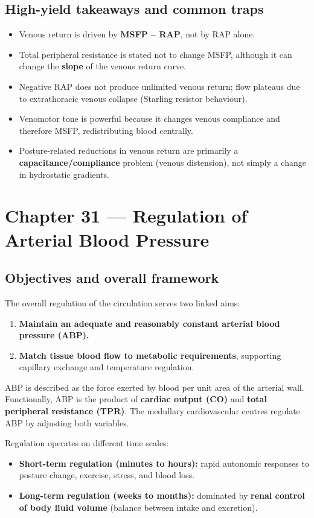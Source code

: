 \documentclass[11pt,a4paper]{article}
\begin{document}
\subsection{High-yield takeaways and common traps}
\begin{itemize}
\item Venous return is driven by \textbf{MSFP -- RAP}, not by RAP alone.
\item Total peripheral resistance is stated not to change MSFP, although it can change the \textbf{slope} of the venous return curve.
\item Negative RAP does not produce unlimited venous return; flow plateaus due to extrathoracic venous collapse (Starling resistor behaviour).
\item Venomotor tone is powerful because it changes venous compliance and therefore MSFP, redistributing blood centrally.
\item Posture-related reductions in venous return are primarily a \textbf{capacitance/compliance} problem (venous distension), not simply a change in hydrostatic gradients.
\end{itemize}


\section{Chapter 31 --- Regulation of Arterial Blood Pressure}

\subsection{Objectives and overall framework}
The overall regulation of the circulation serves two linked aims:
\begin{enumerate}
\item \textbf{Maintain an adequate and reasonably constant arterial blood pressure (ABP).}
\item \textbf{Match tissue blood flow to metabolic requirements}, supporting capillary exchange and temperature regulation.
\end{enumerate}

ABP is described as the force exerted by blood per unit area of the arterial wall. Functionally, ABP is the product of \textbf{cardiac output (CO)} and \textbf{total peripheral resistance (TPR)}. The medullary cardiovascular centres regulate ABP by adjusting both variables.

Regulation operates on different time scales:
\begin{itemize}
\item \textbf{Short-term regulation (minutes to hours):} rapid autonomic responses to posture change, exercise, stress, and blood loss.
\item \textbf{Long-term regulation (weeks to months):} dominated by \textbf{renal control of body fluid volume} (balance between intake and excretion).
\end{itemize}
\end{document}
